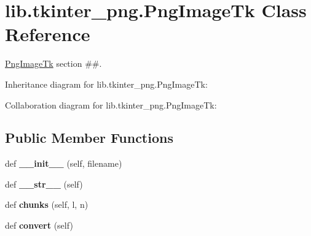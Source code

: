 \hypertarget{classlib_1_1tkinter__png_1_1_png_image_tk}{}\section{lib.\+tkinter\+\_\+png.\+Png\+Image\+Tk Class Reference}
\label{classlib_1_1tkinter__png_1_1_png_image_tk}


\hyperlink{classlib_1_1tkinter__png_1_1_png_image_tk}{Png\+Image\+Tk} section \#\#.  




Inheritance diagram for lib.\+tkinter\+\_\+png.\+Png\+Image\+Tk\+:


Collaboration diagram for lib.\+tkinter\+\_\+png.\+Png\+Image\+Tk\+:
\subsection*{Public Member Functions}
\begin{DoxyCompactItemize}
\item 
\mbox{\label{classlib_1_1tkinter__png_1_1_png_image_tk_a4abe5901919b411e92936c5a1384dcf3}} 
def {\bfseries \+\_\+\+\_\+init\+\_\+\+\_\+} (self, filename)
\item 
\mbox{\label{classlib_1_1tkinter__png_1_1_png_image_tk_aef83ed6c8b3c3ecbcb3501ad59f41a3b}} 
def {\bfseries \+\_\+\+\_\+str\+\_\+\+\_\+} (self)
\item 
\mbox{\label{classlib_1_1tkinter__png_1_1_png_image_tk_adfd92b37c4a53417305372f5379e3dd4}} 
def {\bfseries chunks} (self, l, n)
\item 
\mbox{\label{classlib_1_1tkinter__png_1_1_png_image_tk_a582fc33a2dc14dffc6785140a9dff9a8}} 
def {\bfseries convert} (self)
\end{DoxyCompactItemize}
